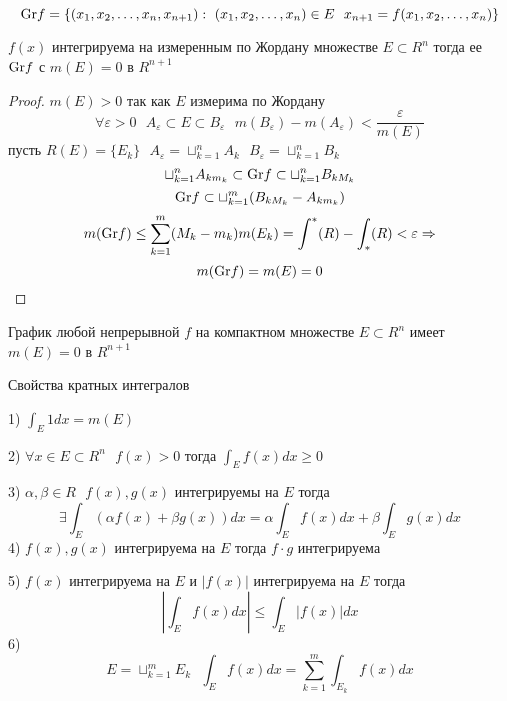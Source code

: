 \begin{define}
  $$
  \mathrm{Gr} f = \{ (x_1, x_2, \ldots, x_n, x_{n+1}): ~ (x_1, x_2, \ldots, x_n) \in E
  ~~ x_{n+1} = f(x_1, x_2, \ldots, x_n) \}
  $$
\end{define}

\begin{theorem}
  $f(x)$ интегрируема на измеренным по Жордану множестве $E \subset R^n$ тогда
  ее $\mathrm{Gr} f$ с $m(E) = 0$ в $R^{n+1}$
\end{theorem}

\begin{proof}
  $m(E) > 0$ так как $E$ измерима по Жордану
  $$
  \forall \varepsilon > 0 ~~~ A_{\varepsilon} \subset E \subset B_{\varepsilon}
  ~~~ m(B_{\varepsilon}) - m(A_{\varepsilon}) < \frac{\varepsilon}{m(E)}
  $$
  пусть $R(E) = \{E_k\} ~~~ A_{\varepsilon} = \sqcup_{k=1}^n A_k ~~~
  B_{\varepsilon} = \sqcup_{k=1}^n B_k$
  $$
  \sqcup_{k=1}^n A_{k m_k} \subset \mathrm{Gr} f \subset \sqcup_{k=1}^n B_{k M_k}
  $$
  $$
  \mathrm{Gr} f \subset \sqcup_{k=1}^m (B_{k M_k} - A_{k m_k})
  $$
  $$
  m(\mathrm{Gr} f) \le \sum_{k=1}^m (M_k - m_k)m(E_k) =
  \int^* (R) - \int_* (R) < \varepsilon \Rightarrow
  $$
  $$
  m(\mathrm{Gr} f) = m(E) = 0
  $$
\end{proof}

\begin{block}[Следствие]
  График любой непрерывной $f$ на компактном множестве $E \subset R^n$ имеет
  $m(E)=0$ в $R^{n+1}$
\end{block}

\begin{title}[\Large]
  Свойства кратных интегралов
\end{title}

\begin{block}[Свойства]
  1) $\int_E 1 dx = m(E)$

  2) $\forall x \in E \subset R^n ~~~ f(x) > 0$ тогда $\int_E f(x) dx \ge 0$

  3) $\alpha, \beta \in R ~~~ f(x), g(x)$ интегрируемы на $E$ тогда
  $$
  \exists \int_E (\alpha f(x) + \beta g(x)) dx = \alpha \int_E f(x)dx +
  \beta \int_E g(x) dx
  $$
  4) $f(x), g(x)$ интегрируема на $E$ тогда $f \cdot g$ интегрируема

  5) $f(x)$ интегрируема на $E$ и $|f(x)|$ интегрируема на $E$ тогда
  $$
  \left| \int_E f(x) dx \right| \le \int_E |f(x)|dx
  $$
  6)
  $$
  E = \sqcup_{k=1}^m E_k ~~~ \int_E f(x) dx = \sum_{k=1}^m \int_{E_k} f(x) dx
  $$
\end{block}

